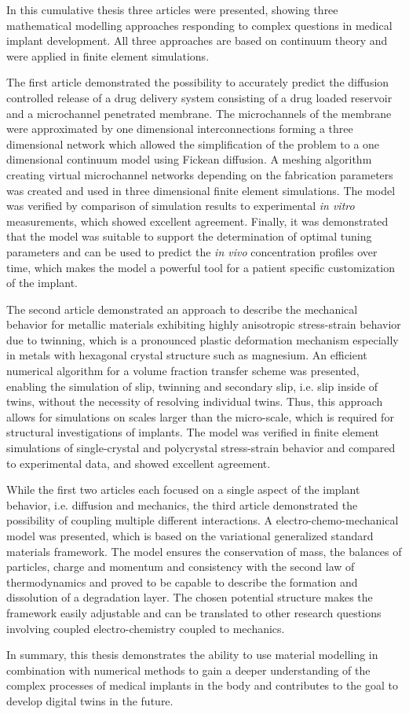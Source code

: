 In this cumulative thesis three articles were presented, showing three mathematical modelling approaches responding to complex questions in medical implant development. All three approaches are based on continuum theory and were applied in finite element simulations. 

The first article demonstrated the possibility to accurately predict the diffusion controlled release of a drug delivery system consisting of a drug loaded reservoir and a microchannel penetrated membrane. The microchannels of the membrane were approximated by one dimensional interconnections forming a three dimensional network which allowed the simplification of the problem to a one dimensional continuum model using Fickean diffusion. A meshing algorithm creating virtual microchannel networks depending on the fabrication parameters was created and used in three dimensional finite element simulations. The model was verified by comparison of simulation results to experimental \textit{in vitro} measurements, which showed excellent agreement. Finally, it was demonstrated that the model was suitable to support the determination of optimal tuning parameters and can be used to predict the \textit{in vivo} concentration profiles over time, which makes the model a powerful tool for a patient specific customization of the implant.

The second article demonstrated an approach to describe the mechanical behavior for metallic materials exhibiting highly anisotropic stress-strain behavior due to twinning, which is a pronounced plastic deformation mechanism especially in metals with hexagonal crystal structure such as magnesium. An efficient numerical algorithm for a volume fraction transfer scheme was presented, enabling the simulation of slip, twinning and secondary slip, i.e. slip inside of twins, without the necessity of resolving individual twins. Thus, this approach allows for simulations on scales larger than the micro-scale, which is required for structural investigations of implants. The model was verified in finite element simulations of single-crystal and polycrystal stress-strain behavior and compared to experimental data, and showed excellent agreement.  

While the first two articles each focused on a single aspect of the implant behavior, i.e. diffusion and mechanics, the third article demonstrated the possibility of coupling multiple different interactions. A electro-chemo-mechanical model was presented, which is based on the variational generalized standard materials framework. The model ensures the conservation of mass, the balances of particles, charge and momentum and consistency with the second law of thermodynamics and proved to be capable to describe the formation and dissolution of a degradation layer. The chosen potential structure makes the framework easily adjustable and can be translated to other research questions involving coupled electro-chemistry coupled to mechanics. 

In summary, this thesis demonstrates the ability to use material modelling in combination with numerical methods to gain a deeper understanding of the complex processes of medical implants in the body and contributes to the goal to develop digital twins in the future. 